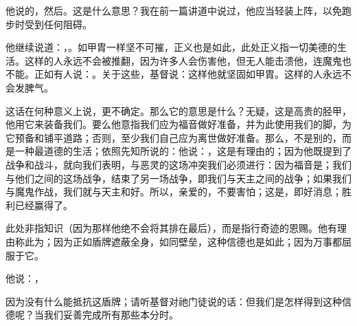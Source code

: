 \par

\par

他说的，然后。这是什么意思？我在前一篇讲道中说过，他应当轻装上阵，以免跑步时受到任何阻碍。\par

他继续说道：，。如甲胄一样坚不可摧，正义也是如此，此处正义指一切美德的生活。这样的人永远不会被推翻，因为许多人会伤害他，但无人能击溃他，连魔鬼也不能。正如有人说：。关于这些，基督说：这样他就坚固如甲胄。这样的人永远不会发脾气。\par

这话在何种意义上说，更不确定。那么它的意思是什么？无疑，这是高贵的胫甲，他用它来装备我们。要么他意指我们应为福音做好准备，并为此使用我们的脚，为它预备和铺平道路；否则，至少我们自己应为离世做好准备。那么，不是别的，而是一种最道德的生活；依照先知所说的：他说：，这是有理由的；因为他既提到了战争和战斗，就向我们表明，与恶灵的这场冲突我们必须进行：因为福音是；我们与他们之间的这场战争，结束了另一场战争，即我们与天主之间的战争；如果我们与魔鬼作战，我们就与天主和好。所以，亲爱的，不要害怕；这是，即好消息；胜利已经赢得了。\par

\par

此处非指知识（因为那样他绝不会将其排在最后），而是指行奇迹的恩赐。他有理由称此为；因为正如盾牌遮蔽全身，如同壁垒，这种信德也是如此；因为万事都屈服于它。\par

他说：，\par

因为没有什么能抵抗这盾牌；请听基督对祂门徒说的话：但我们是怎样得到这种信德呢？当我们妥善完成所有那些本分时。\par

